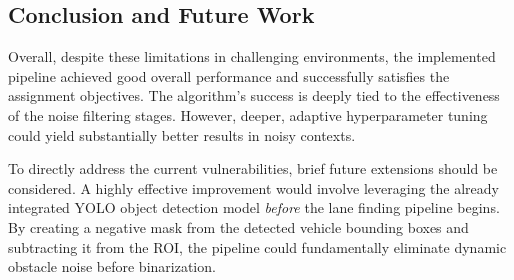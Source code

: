 \documentclass[12pt,a4paper]{article}
\begin{document}
\subsection{Conclusion and Future Work}
Overall, despite these limitations in challenging environments, the implemented pipeline achieved good overall performance and successfully satisfies the assignment objectives. The algorithm's success is deeply tied to the effectiveness of the noise filtering stages. However, deeper, adaptive hyperparameter tuning could yield substantially better results in noisy contexts.

To directly address the current vulnerabilities, brief future extensions should be considered. A highly effective improvement would involve leveraging the already integrated YOLO object detection model \textit{before} the lane finding pipeline begins. By creating a negative mask from the detected vehicle bounding boxes and subtracting it from the ROI, the pipeline could fundamentally eliminate dynamic obstacle noise before binarization.
\end{document}

